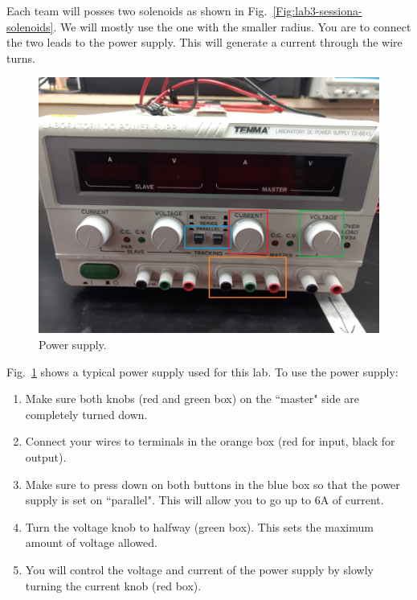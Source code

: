 \documentclass[12pt]{report}
\begin{document}
Each team will posses two solenoids as shown in Fig.~\ref{Fig:lab3-sessiona-solenoids}. We will mostly use the one with the smaller radius. You are to connect the two leads to the power supply. This will generate a current through the wire turns.

\begin{figure}[h]
\centering
\includegraphics[scale=0.4]{lab3-power-supply}
\caption{Power supply.}
\label{Fig:lab3-power-supply}
\end{figure}
Fig.~\ref{Fig:lab3-power-supply} shows a typical power supply used for this lab. To use the power supply:
\begin{enumerate}
\item Make sure both knobs (red and green box) on the ``master" side are completely turned down.
\item Connect your wires to terminals in the orange box (red for input, black for output).
\item Make sure to press down on both buttons in the blue box so that the power supply is set on ``parallel". This will allow you to go up to 6A of current.
\item Turn the voltage knob to halfway (green box). This sets the maximum amount of voltage allowed.
\item You will control the voltage and current of the power supply by slowly turning the current knob (red box).\\
\end{enumerate}
\end{document}
